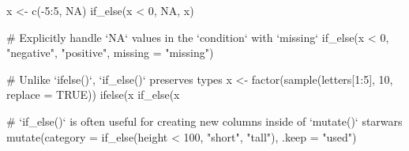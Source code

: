 %
\begin{Examples}
\begin{ExampleCode}
x <- c(-5:5, NA)
if_else(x < 0, NA, x)

# Explicitly handle `NA` values in the `condition` with `missing`
if_else(x < 0, "negative", "positive", missing = "missing")

# Unlike `ifelse()`, `if_else()` preserves types
x <- factor(sample(letters[1:5], 10, replace = TRUE))
ifelse(x %
if_else(x %

# `if_else()` is often useful for creating new columns inside of `mutate()`
starwars %
  mutate(category = if_else(height < 100, "short", "tall"), .keep = "used")
\end{ExampleCode}
\end{Examples}
